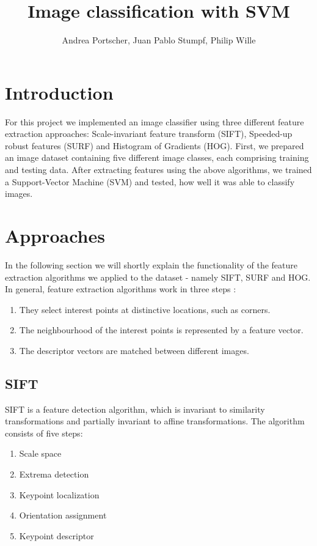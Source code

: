 \documentclass{scrartcl}
\title{Image classification with SVM}
\author{Andrea Portscher, Juan Pablo Stumpf, Philip Wille}
\begin{document}
\maketitle

\section{Introduction}
For this project we implemented an image classifier using three different feature extraction approaches: Scale-invariant feature transform (SIFT), Speeded-up robust features (SURF) and Histogram of Gradients (HOG). First, we prepared an image dataset containing five different image classes, each comprising training and testing data. After extracting features using the above algorithms, we trained a Support-Vector Machine (SVM) and tested, how well it was able to classify images.
\section{Approaches}
In the following section we will shortly explain the functionality of the feature extraction algorithms we applied to the dataset - namely SIFT, SURF and HOG.
In general, feature extraction algorithms work in three steps \cite{bay2006}:
\begin{enumerate}
  \item They select interest points at distinctive locations, such as corners.
  \item The neighbourhood of the interest points is represented by a feature vector.
  \item The descriptor vectors are matched between different images.
\end{enumerate}

\subsection{SIFT}
SIFT is a feature detection algorithm, which is invariant to similarity transformations and partially invariant to affine transformations. The algorithm consists of five steps:

\begin{enumerate}
    \item Scale space
    \item Extrema detection
    \item Keypoint localization
    \item Orientation assignment
    \item Keypoint descriptor
\end{enumerate}
\end{document}
